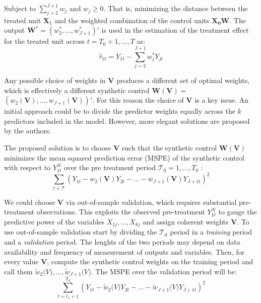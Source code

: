 \documentclass[12pt,a4paper,draft]{article}
\begin{document}
Subject to $\sum_{j=2}^{J+1}w_j$ and $w_j \geq 0$. 
That is, minimizing the distance between the treated unit $\mathbf{X}_1$ and 
the weighted combination of the control units $\mathbf{X_0} \mathbf{W}$. 
The output $\mathbf{W}^*=
\left( w_2^*,...,w_{J+1}^*\right) '$ is used in the estimation of the treatment 
effect for the treated unit across $t=T_0+1,...,T$ as:
\begin{equation}
    \hat{\tau}_{1t} = Y_{1t} - \sum_{j=2}^{J+1}{w^*_j Y_{jt}}
\end{equation}


Any possible choice of weights in $\mathbf{V}$ produces a different set of optimal 
weights, which is effectively a different synthetic control 
$\mathbf{W}(\mathbf{V})=$ \newline $\left(w_2(\mathbf{V}),...,w_{J+1}(\mathbf{V})\right)'$.
For this reason the choice of $\mathbf{V}$ is a key issue. An initial approach could 
be to divide the predictor weights equally across the $k$ predictors included in the 
model. However, more elegant solutions are proposed by the authors.


The proposed solution is to choose $\mathbf{V}$ such that the synthetic 
control $\mathbf{W}(\mathbf{V})$ minimizes the mean squared prediction error (MSPE) 
of the synthetic control with respect to $Y_{1t}^N$ over the pre treatment period
$\mathcal{T}_0 = 1,..., T_0$ : 
\begin{equation}
    \sum_{t\in\mathcal{T}} {\left(
    Y_{1t}-w_2 \mathbf{(V)} Y_{2t}-...-w_{J+1}(\mathbf{V})Y_{J+1t}
\right)} ^2
\end{equation}

We could choose $\mathbf{V}$ via out-of-sample validation, which requires substantial 
pre-treatment observations. This exploits the observed pre-treatment $Y_{1t}^N$
to gauge the predictive power of the variables $X_{1j},...,X_{kj}$ and assign 
coherent weights $\mathbf{V}$. To use out-of-sample validation start by 
dividing the $\mathcal{T}_0$ period in a \emph{training} period and a 
\emph{validation} period. The lenghts of the two periods may depend on data 
availability and frequency of measurement of outputs and variables. Then, for 
every value $\mathbf{V}$, compute the synthetic control weights on the training 
period and call them $\tilde{w}_2 \mathbf(V), ..., \tilde{w}_{J+1} \mathbf(V)$.
The MSPE over the validation period will be:
\begin{equation}
    \sum_{t=t_1+1}^{T_0} \left(
    Y_{1t}-\tilde{w}_2 \mathbf(V) Y_{2t} - ... - 
    \tilde{w}_{J+1} \mathbf(V) Y_{J+1t} \right)^2
\end{equation}
\end{document}
